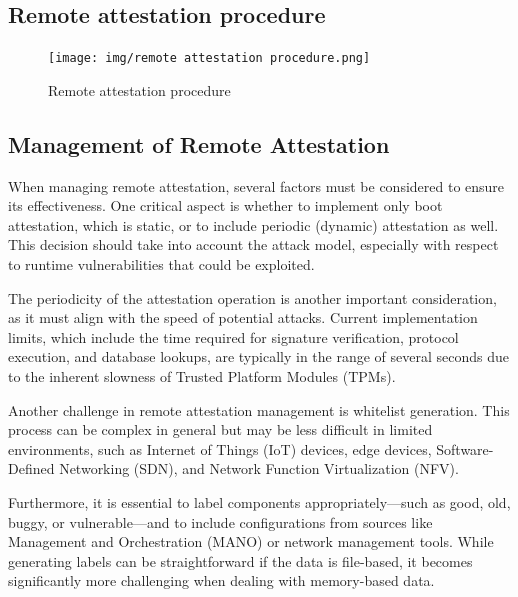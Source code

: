 \subsection{Remote attestation procedure}
\begin{figure}[H]
  \centering
  \texttt{[image: img/remote attestation
  procedure.png]}
  \caption{Remote attestation procedure}
\end{figure}

\subsection{Management of Remote Attestation}

When managing remote attestation, several factors must be considered
to ensure its effectiveness. One critical aspect is whether to
implement only boot attestation, which is static, or to include
periodic (dynamic) attestation as well. This decision should take into
account the attack model, especially with respect to runtime
vulnerabilities that could be exploited.

The periodicity of the attestation operation is another important
consideration, as it must align with the speed of potential attacks.
Current implementation limits, which include the time required for
signature verification, protocol execution, and database lookups, are
typically in the range of several seconds due to the inherent slowness
of Trusted Platform Modules (TPMs).

Another challenge in remote attestation management is whitelist
generation. This process can be complex in general but may be less
difficult in limited environments, such as Internet of Things (IoT)
devices, edge devices, Software-Defined Networking (SDN), and Network
Function Virtualization (NFV). 

Furthermore, it is essential to label components appropriately—such as
good, old, buggy, or vulnerable—and to include configurations from
sources like Management and Orchestration (MANO) or network management
tools. While generating labels can be straightforward if the data is
file-based, it becomes significantly more challenging when dealing
with memory-based data.

